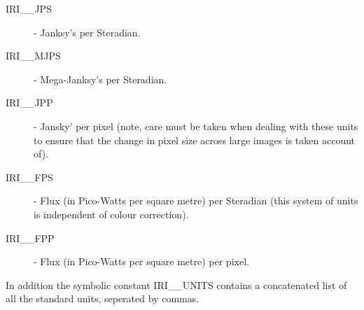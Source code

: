 \begin{description}
\item [IRI\_\_JPS] - Janksy's per Steradian.
\item [IRI\_\_MJPS] - Mega-Janksy's per Steradian.
\item [IRI\_\_JPP] - Jansky' per pixel (note, care must be taken when dealing
with these units to ensure that the change in pixel size across large images is
taken account of).
\item [IRI\_\_FPS] - Flux (in Pico-Watts per square metre) per Steradian (this
system of units is independent of colour correction).
\item [IRI\_\_FPP] - Flux (in Pico-Watts per square metre) per pixel.
\end{description}

In addition the symbolic constant IRI\_\_UNITS contains a concatenated list of
all the standard units, seperated by commas.

